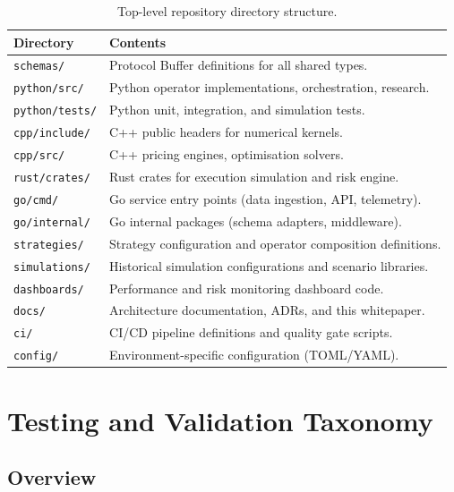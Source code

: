 \documentclass[12pt,openany]{book}
\numberwithin{equation}{chapter}
\theoremstyle{plain}
\theoremstyle{definition}
\theoremstyle{remark}
\begin{document}
\begin{table}[H]
\centering
\caption{Top-level repository directory structure.}
\label{tab:repo_structure}
\small
\begin{tabularx}{\textwidth}{p{4.5cm} p{10.0cm}}
\toprule
\textbf{Directory} & \textbf{Contents} \\
\midrule
\texttt{schemas/} & Protocol Buffer definitions for all shared types. \\
\texttt{python/src/} & Python operator implementations, orchestration, research. \\
\texttt{python/tests/} & Python unit, integration, and simulation tests. \\
\texttt{cpp/include/} & C++ public headers for numerical kernels. \\
\texttt{cpp/src/} & C++ pricing engines, optimisation solvers. \\
\texttt{rust/crates/} & Rust crates for execution simulation and risk engine. \\
\texttt{go/cmd/} & Go service entry points (data ingestion, API, telemetry). \\
\texttt{go/internal/} & Go internal packages (schema adapters, middleware). \\
\texttt{strategies/} & Strategy configuration and operator composition definitions. \\
\texttt{simulations/} & Historical simulation configurations and scenario libraries. \\
\texttt{dashboards/} & Performance and risk monitoring dashboard code. \\
\texttt{docs/} & Architecture documentation, ADRs, and this whitepaper. \\
\texttt{ci/} & CI/CD pipeline definitions and quality gate scripts. \\
\texttt{config/} & Environment-specific configuration (TOML/YAML). \\
\bottomrule
\end{tabularx}
\end{table}

\chapter{Testing and Validation Taxonomy}

\section{Overview}
\end{document}
